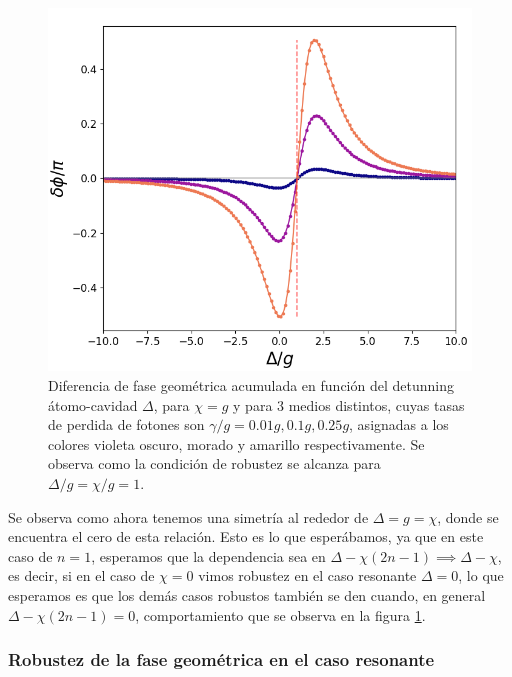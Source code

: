 \begin{figure}[H]
    \begin{minipage}[c]{0.67\textwidth}
        \includegraphics[width=\textwidth]{figuras/ch3/robustez x=g.png}
    \end{minipage}\hfill
    \begin{minipage}[c]{0.3\textwidth}
    \caption{Diferencia de fase geométrica acumulada en función del detunning átomo-cavidad $\Delta$, para $\chi=g$ y para 3 medios distintos, cuyas tasas de perdida de fotones son $\gamma/g=0.01g,0.1g,0.25g$, asignadas a los colores violeta oscuro, morado y amarillo respectivamente. Se observa como la condición de robustez se alcanza para $\Delta/g=\chi/g=1$.
         } \label{fig3:robustez mixta}
  \end{minipage}
\end{figure}
Se observa como ahora tenemos una simetría al rededor de $\Delta=g=\chi$, donde se encuentra el cero de esta relación. Esto es lo que esperábamos, ya que en este caso de $n=1$, esperamos que la dependencia sea en $\Delta-\chi(2n-1) \implies \Delta-\chi$, es decir, si en el caso de $\chi=0$ vimos robustez en el caso resonante $\Delta=0$, lo que esperamos es que los demás casos robustos también se den cuando, en general $\Delta-\chi(2n-1)=0$, comportamiento que se observa en la figura \ref{fig3:robustez mixta}.
\subsubsection{Robustez de la fase geométrica en el caso resonante}

